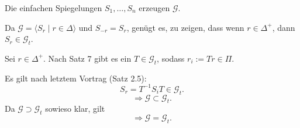 \documentclass{article}
\begin{document}
\begin{satz} %
    Die einfachen Spiegelungen \( S_1, \ldots, S_n \) 
    erzeugen \( \mathscr{G} \).
\end{satz}

\begin{bew}
    Da \( \mathscr{G} = \langle S_r \;\vert\; r \in \Delta \rangle \) 
    und \( S_{-r} = S_r \), genügt es, zu zeigen, dass wenn 
    \( r\in \Delta^+ \), dann \( S_r \in \mathscr{G}_t \).

    Sei \( r \in \Delta^+ \). Nach Satz 7 gibt es 
    ein \( T \in \mathscr{G}_t \), sodass 
    \( r_i := Tr \in \Pi \).

    Es gilt nach letztem Vortrag (Satz 2.5):
    \[ S_r = T^{-1} S_i T \in \mathscr{G}_t. \]
    \[ \Rightarrow \mathscr{G} \subset \mathscr{G}_t. \]
    Da \( \mathscr{G} \supset \mathscr{G}_t \) sowieso klar, gilt
    \[ \Rightarrow \mathscr{G} = \mathscr{G}_t. \]
\end{bew}
\end{document}

